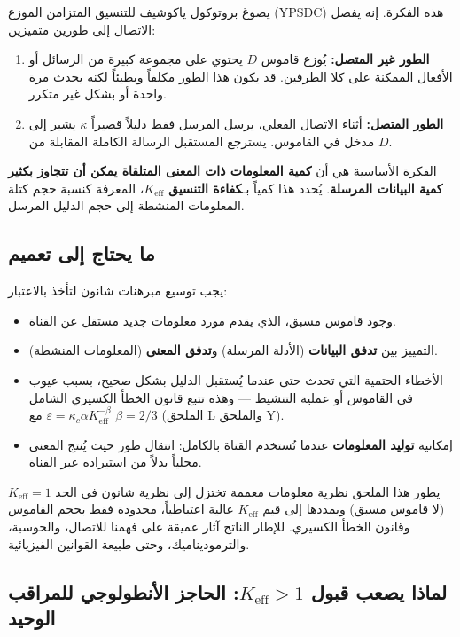 \documentclass[12pt,a4paper]{article}
\newcommand{\Keff}{K_{\mathrm{eff}}}
\theoremstyle{remark}
\begin{document}
	يصوغ بروتوكول ياكوشيف للتنسيق المتزامن الموزع (YPSDC) \cite{Yakushev2026a, AppendixB} هذه الفكرة. إنه يفصل الاتصال إلى طورين متميزين:
	\begin{enumerate}
		\item \textbf{الطور غير المتصل:} يُوزع قاموس $D$ يحتوي على مجموعة كبيرة من الرسائل أو الأفعال الممكنة على كلا الطرفين. قد يكون هذا الطور مكلفاً وبطيئاً لكنه يحدث مرة واحدة أو بشكل غير متكرر.
		\item \textbf{الطور المتصل:} أثناء الاتصال الفعلي، يرسل المرسل فقط دليلاً قصيراً $\kappa$ يشير إلى مدخل في القاموس. يسترجع المستقبل الرسالة الكاملة المقابلة من $D$.
	\end{enumerate}
	
	الفكرة الأساسية هي أن \textbf{كمية المعلومات ذات المعنى المتلقاة يمكن أن تتجاوز بكثير كمية البيانات المرسلة}. يُحدد هذا كمياً بـ\textbf{كفاءة التنسيق} $\Keff$، المعرفة كنسبة حجم كتلة المعلومات المنشطة إلى حجم الدليل المرسل.
	
	\subsection{ما يحتاج إلى تعميم}
	
	يجب توسيع مبرهنات شانون لتأخذ بالاعتبار:
	\begin{itemize}
		\item وجود قاموس مسبق، الذي يقدم مورد معلومات جديد مستقل عن القناة.
		\item التمييز بين \textbf{تدفق البيانات} (الأدلة المرسلة) و\textbf{تدفق المعنى} (المعلومات المنشطة).
		\item الأخطاء الحتمية التي تحدث حتى عندما يُستقبل الدليل بشكل صحيح، بسبب عيوب في القاموس أو عملية التنشيط — وهذه تتبع قانون الخطأ الكسيري الشامل $\varepsilon = \kappa_c\alpha K_{\mathrm{eff}}^{-\beta}$ مع $\beta=2/3$ (الملحق L والملحق Y).
		\item إمكانية \textbf{توليد المعلومات} عندما تُستخدم القناة بالكامل: انتقال طور حيث يُنتج المعنى محلياً بدلاً من استيراده عبر القناة.
	\end{itemize}
	
	يطور هذا الملحق نظرية معلومات معممة تختزل إلى نظرية شانون في الحد $\Keff = 1$ (لا قاموس مسبق) ويمددها إلى قيم $\Keff$ عالية اعتباطياً، محدودة فقط بحجم القاموس وقانون الخطأ الكسيري. للإطار الناتج آثار عميقة على فهمنا للاتصال، والحوسبة، والترموديناميك، وحتى طبيعة القوانين الفيزيائية.
	
	\subsection{لماذا يصعب قبول \(K_{\mathrm{eff}} > 1\): الحاجز الأنطولوجي للمراقب الوحيد}
	
\end{document}
